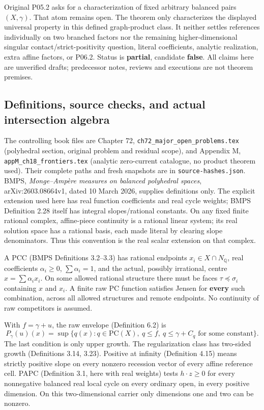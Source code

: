 \documentclass[
  11pt,
]{article}
\begin{document}
Original P05.2 asks for a characterization of fixed arbitrary balanced
pairs \((X,\gamma)\). That atom remains open. The theorem only
characterizes the displayed universal property in this defined
graph-product class. It neither settles references individually on two
branched factors nor the remaining higher-dimensional singular
contact/strict-positivity question, literal coefficients, analytic
realization, extra affine factors, or P06.2. Status is \textbf{partial},
candidate \textbf{false}. All claims here are unverified drafts;
predecessor notes, reviews and executions are not theorem premises.

\subsection{Definitions, source checks, and actual intersection
algebra}\label{definitions-source-checks-and-actual-intersection-algebra}

The controlling book files are Chapter 72,
\texttt{ch72\_major\_open\_problems.tex} (polyhedral section, original
problem and residual scope), and Appendix M,
\texttt{appM\_ch18\_frontiers.tex} (analytic zero-current catalogue, no
product theorem used). Their complete paths and fresh snapshots are in
\texttt{source-hashes.json}. BMPS, \emph{Monge--Ampère measures on
balanced polyhedral spaces}, arXiv:2603.08664v1, dated 10 March 2026,
supplies definitions only. The explicit extension used here has real
function coefficients and real cycle weights; BMPS Definition 2.28
itself has integral slopes/rational constants. On any fixed finite
rational complex, affine-piece continuity is a rational linear system;
its real solution space has a rational basis, each made literal by
clearing slope denominators. Thus this convention is the real scalar
extension on that complex.

A PCC (BMPS Definitions 3.2--3.3) has rational endpoints
\(x_i\in X\cap N_\mathbb Q\), real coefficients \(\alpha_i\geq0\),
\(\sum\alpha_i=1\), and the actual, possibly irrational, centre
\(x=\sum\alpha_i x_i\). On some allowed rational structure there must be
faces \(\tau\preceq\sigma_i\) containing \(x\) and \(x_i\). A finite raw
PC function satisfies Jensen for \textbf{every} such combination, across
all allowed structures and remote endpoints. No continuity of raw
competitors is assumed.

With \(f=\gamma+u\), the raw envelope (Definition 6.2) is \[
 P_\gamma(u)(x)=\sup\{q(x):q\in\mathrm{PC}(X),\ q\leq f,
                          \ q\leq\gamma+C_q\text{ for some constant}\}.
                                                               \tag{4}
\] The last condition is only upper growth. The regularization class has
two-sided growth (Definitions 3.14, 3.23). Positive at infinity
(Definition 4.15) means strictly positive slope on every nonzero
recession vector of every affine reference cell. PAPC (Definition 3.1,
here with real weights) tests \(h\cdot z\geq0\) for every nonnegative
balanced real local cycle on every ordinary open, in every positive
dimension. On this two-dimensional carrier only dimensions one and two
can be nonzero.
\end{document}
